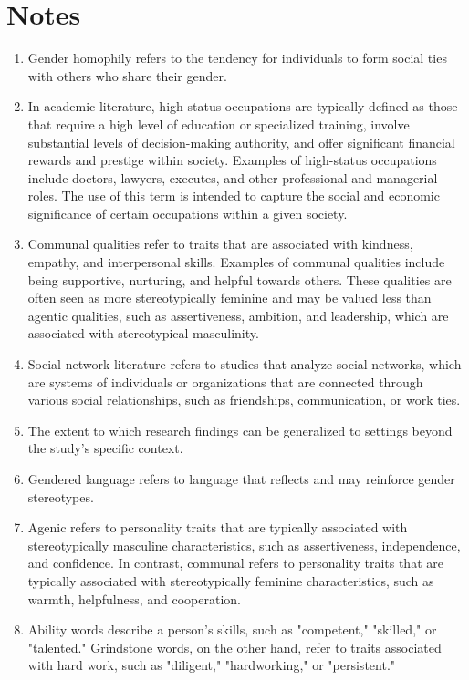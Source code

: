 \documentclass[12pt]{caltech_thesis}
\begin{document}
\chapter{Notes}
\begin{enumerate}
    \item Gender homophily refers to the tendency for individuals to form social ties with others who share their gender.
    \item In academic literature, high-status occupations are typically defined as those that require a high level of education or specialized training, involve substantial levels of decision-making authority, and offer significant financial rewards and prestige within society. Examples of high-status occupations include doctors, lawyers, executes, and other professional and managerial roles. The use of this term is intended to capture the social and economic significance of certain occupations within a given society. 
    \item Communal qualities refer to traits that are associated with kindness, empathy, and interpersonal skills. Examples of communal qualities include being supportive, nurturing, and helpful towards others. These qualities are often seen as more stereotypically feminine and may be valued less than agentic qualities, such as assertiveness, ambition, and leadership, which are associated with stereotypical masculinity. 
    \item Social network literature refers to studies that analyze social networks, which are systems of individuals or organizations that are connected through various social relationships, such as friendships, communication, or work ties. 
    \item The extent to which research findings can be generalized to settings beyond the study’s specific context.
    \item Gendered language refers to language that reflects and may reinforce gender stereotypes.
    \item Agenic refers to personality traits that are typically associated with stereotypically masculine characteristics, such as assertiveness, independence, and confidence. In contrast, communal refers to personality traits that are typically associated with stereotypically feminine characteristics, such as warmth, helpfulness, and cooperation.
    \item Ability words describe a person's skills, such as "competent," "skilled," or "talented." Grindstone words, on the other hand, refer to traits associated with hard work, such as "diligent," "hardworking," or "persistent." 

\end{enumerate}
\end{document}
